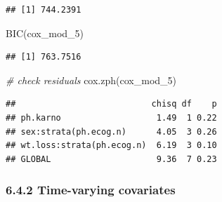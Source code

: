 \documentclass[
]{article}
\newenvironment{Shaded}{\begin{snugshade}}{\end{snugshade}}
\newcommand{\CommentTok}[1]{\textcolor[rgb]{0.56,0.35,0.01}{\textit{#1}}}
\newcommand{\FunctionTok}[1]{\textcolor[rgb]{0.00,0.00,0.00}{#1}}
\newcommand{\NormalTok}[1]{#1}
\begin{document}
\begin{verbatim}
## [1] 744.2391
\end{verbatim}

\begin{Shaded}
\begin{Highlighting}[]
\FunctionTok{BIC}\NormalTok{(cox\_mod\_5)}
\end{Highlighting}
\end{Shaded}

\begin{verbatim}
## [1] 763.7516
\end{verbatim}

\begin{Shaded}
\begin{Highlighting}[]
\CommentTok{\# check residuals}
\FunctionTok{cox.zph}\NormalTok{(cox\_mod\_5)}
\end{Highlighting}
\end{Shaded}

\begin{verbatim}
##                           chisq df    p
## ph.karno                   1.49  1 0.22
## sex:strata(ph.ecog.n)      4.05  3 0.26
## wt.loss:strata(ph.ecog.n)  6.19  3 0.10
## GLOBAL                     9.36  7 0.23
\end{verbatim}

\hypertarget{time-varying-covariates}{%
\subsubsection{6.4.2 Time-varying
covariates}\label{time-varying-covariates}}
\end{document}
